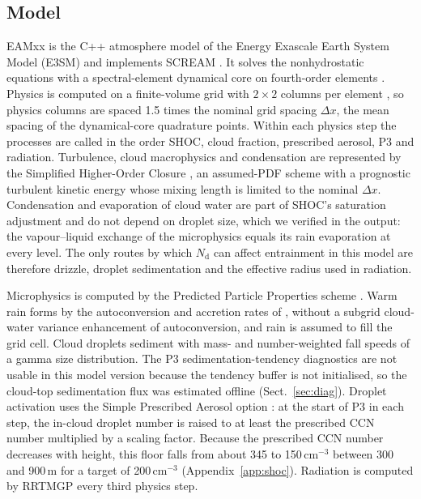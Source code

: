 \documentclass[acp, manuscript]{copernicus}
\newcommand{\Nd}{N_\mathrm{d}}
\newcommand{\dx}{\Delta x}
\newcommand{\cmthree}{\mathrm{cm^{-3}}}
\begin{document}
\subsection{Model}

EAMxx is the C++ atmosphere model of the Energy Exascale Earth System Model (E3SM) and implements SCREAM \citep{caldwell2021,donahue2024}. It solves the nonhydrostatic equations with a spectral-element dynamical core on fourth-order elements \citep{taylor2020}. Physics is computed on a finite-volume grid with $2\times2$ columns per element \citep{hannah2021}, so physics columns are spaced 1.5 times the nominal grid spacing $\dx$, the mean spacing of the dynamical-core quadrature points. Within each physics step the processes are called in the order SHOC, cloud fraction, prescribed aerosol, P3 and radiation. Turbulence, cloud macrophysics and condensation are represented by the Simplified Higher-Order Closure \citep[SHOC;][]{bogenschutz2013}, an assumed-PDF scheme with a prognostic turbulent kinetic energy whose mixing length is limited to the nominal $\dx$. Condensation and evaporation of cloud water are part of SHOC's saturation adjustment and do not depend on droplet size, which we verified in the output: the vapour--liquid exchange of the microphysics equals its rain evaporation at every level. The only routes by which $\Nd$ can affect entrainment in this model are therefore drizzle, droplet sedimentation and the effective radius used in radiation.

Microphysics is computed by the Predicted Particle Properties scheme \citep[P3;][]{morrison2015}. Warm rain forms by the autoconversion and accretion rates of \citet{kk2000}, without a subgrid cloud-water variance enhancement of autoconversion, and rain is assumed to fill the grid cell. Cloud droplets sediment with mass- and number-weighted fall speeds of a gamma size distribution. The P3 sedimentation-tendency diagnostics are not usable in this model version because the tendency buffer is not initialised, so the cloud-top sedimentation flux was estimated offline (Sect.~\ref{sec:diag}). Droplet activation uses the Simple Prescribed Aerosol option \citep[SPA;][]{mahfouz2025}: at the start of P3 in each step, the in-cloud droplet number is raised to at least the prescribed CCN number multiplied by a scaling factor. Because the prescribed CCN number decreases with height, this floor falls from about 345 to 150\,$\cmthree$ between 300 and 900\,m for a target of 200\,$\cmthree$ (Appendix~\ref{app:shoc}). Radiation is computed by RRTMGP \citep{pincus2019} every third physics step.
\end{document}
